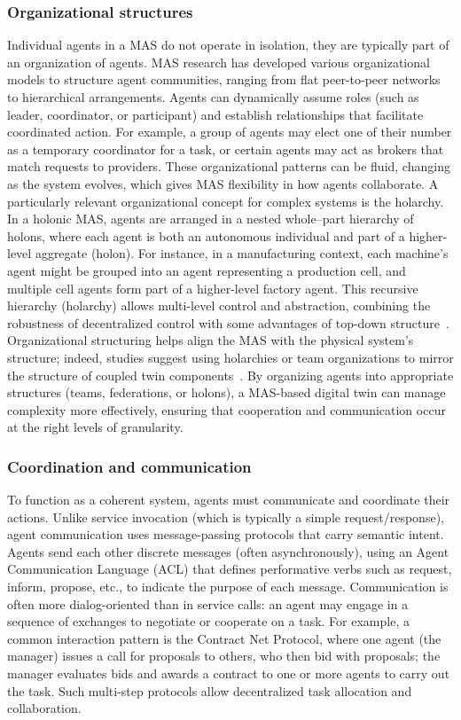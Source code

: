 \subsubsection{Organizational structures}
Individual agents in a MAS do not operate in isolation, they are typically part of an organization of agents. MAS research has developed various organizational models to structure agent communities, ranging from flat peer-to-peer networks to hierarchical arrangements. Agents can dynamically assume roles (such as leader, coordinator, or participant) and establish relationships that facilitate coordinated action. For example, a group of agents may elect one of their number as a temporary coordinator for a task, or certain agents may act as brokers that match requests to providers. These organizational patterns can be fluid, changing as the system evolves, which gives MAS flexibility in how agents collaborate. A particularly relevant organizational concept for complex systems is the holarchy. In a holonic MAS, agents are arranged in a nested whole–part hierarchy of holons, where each agent is both an autonomous individual and part of a higher-level aggregate (holon). For instance, in a manufacturing context, each machine’s agent might be grouped into an agent representing a production cell, and multiple cell agents form part of a higher-level factory agent. This recursive hierarchy (holarchy) allows multi-level control and abstraction, combining the robustness of decentralized control with some advantages of top-down structure~\cite{HorlingLesser2005OrganizationalSurvey}. Organizational structuring helps align the MAS with the physical system’s structure; indeed, studies suggest using holarchies or team organizations to mirror the structure of coupled twin components~\cite{Human2023, Gil2024}. By organizing agents into appropriate structures (teams, federations, or holons), a MAS-based digital twin can manage complexity more effectively, ensuring that cooperation and communication occur at the right levels of granularity.

\subsubsection{Coordination and communication}
To function as a coherent system, agents must communicate and coordinate their actions. Unlike service invocation (which is typically a simple request/response), agent communication uses message-passing protocols that carry semantic intent. Agents send each other discrete messages (often asynchronously), using an Agent Communication Language (ACL) that defines performative verbs such as request, inform, propose, etc., to indicate the purpose of each message. Communication is often more dialog-oriented than in service calls: an agent may engage in a sequence of exchanges to negotiate or cooperate on a task. For example, a common interaction pattern is the Contract Net Protocol, where one agent (the manager) issues a call for proposals to others, who then bid with proposals; the manager evaluates bids and awards a contract to one or more agents to carry out the task. Such multi-step protocols allow decentralized task allocation and collaboration.

